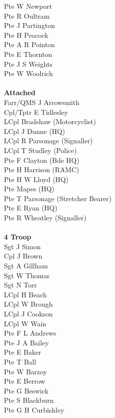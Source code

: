 \begin{multicols}{2}
  Pte W Newport \\
  Pte R Oultram \\
  Pte J Partington \\
  Pte H Peacock \\
  Pte A R Pointon \\
  Pte E Thornton \\
  Pte J S Weights \\
  Pte W Woolrich \\
  \\
  \textbf{Attached} \\
  Farr/QMS J Arrowsmith \\
  Cpl/Tptr E Tidlesley \\
  LCpl Bradshaw (Motorcyclist) \\
  LCpl J Dunne (HQ) \\
  LCpl R Parsonage (Signaller) \\
  LCpl T Studley (Police) \\
  Pte F Clayton (Bde HQ) \\
  Pte H Harrison (RAMC) \\
  Pte H W Lloyd (HQ) \\
  Pte Mapes (HQ) \\
  Pte T Parsonage (Stretcher Bearer) \\
  Pte E Ryan (HQ) \\
  Pte R Wheatley (Signaller) \\
  \\
  \textbf{4 Troop} \\
  Sgt J Simon \\
  Cpl J Brown \\
  Sgt A Gillham \\
  Sgt W Thomas \\
  Sgt N Torr \\
  LCpl H Beach \\
  LCpl W Brough \\
  LCpl J Cookson \\
  LCpl W Wain \\
  Pte F L Andrews \\
  Pte J A Bailey \\
  Pte E Baker \\
  Pte T Ball \\
  Pte W Barzoy \\
  Pte E Berrow \\
  Pte G Beswick \\
  Pte S Blackburn \\
  Pte G H Curbishley \\

\end{multicols}
